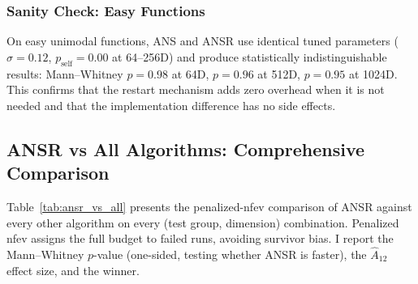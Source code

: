 \documentclass[11pt,a4paper]{article}
\begin{document}
\subsubsection{Sanity Check: Easy Functions}

On easy unimodal functions, ANS and ANSR use identical tuned parameters ($\sigma = 0.12$, $p_{\text{self}} = 0.00$ at 64--256D) and produce statistically indistinguishable results: Mann--Whitney $p = 0.98$ at 64D, $p = 0.96$ at 512D, $p = 0.95$ at 1024D. This confirms that the restart mechanism adds zero overhead when it is not needed and that the implementation difference has no side effects.

\subsection{ANSR vs All Algorithms: Comprehensive Comparison}

Table~\ref{tab:ansr_vs_all} presents the penalized-nfev comparison of ANSR against every other algorithm on every (test group, dimension) combination. Penalized nfev assigns the full budget to failed runs, avoiding survivor bias. I report the Mann--Whitney $p$-value (one-sided, testing whether ANSR is faster), the $\hat{A}_{12}$ effect size, and the winner.
\end{document}
